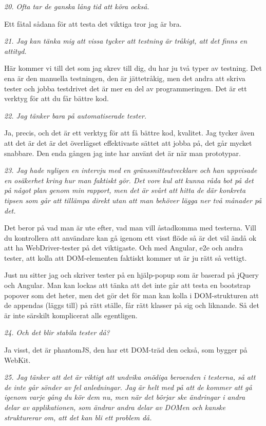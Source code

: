 \documentclass[11pt]{article}
\begin{document}
\emph{20. Ofta tar de ganska lång tid att köra också.}

Ett fåtal sådana för att testa det viktiga tror jag är bra.

\emph{21. Jag kan tänka mig att vissa tycker att testning är tråkigt, att det finns en attityd.}

Här kommer vi till det som jag skrev till dig, du har ju två typer av testning. Det ena är den manuella testningen, den är jättetråkig, men det andra att skriva tester och jobba testdrivet det är mer en del av programmeringen. Det är ett verktyg för att du får bättre kod.

\emph{22. Jag tänker bara på automatiserade tester.}

Ja, precis, och det är ett verktyg för att få bättre kod, kvalitet. Jag tycker även att det är det  är det överlägset effektivaste sättet att jobba på, det går mycket snabbare. Den enda gången jag inte har använt det är när man prototypar.

\emph{23. Jag hade nyligen en intervju med en gränssnittsutvecklare och han uppvisade en osäkerhet kring hur man faktiskt gör. Det vore kul att kunna råda bot på det på något plan genom min rapport, men det är svårt att hitta de där konkreta tipsen som går att tillämpa direkt utan att man behöver lägga ner två månader på det.}

Det beror på vad man är ute efter, vad man vill åstadkomma med testerna. Vill du kontrollera att användare kan gå igenom ett visst flöde så är det väl ändå ok att ha WebDriver-tester på det viktigaste. Och med Angular, e2e och andra tester, att kolla att DOM-elementen faktiskt kommer ut är ju rätt så vettigt.

Just nu sitter jag och skriver tester på en hjälp-popup som är baserad på jQuery och Angular. Man kan lockas att tänka att det inte går att testa en bootstrap popover som det heter, men det gör det för man kan kolla i DOM-strukturen att de appendas (läggs till) på rätt ställe, får rätt klasser på sig och liknande. Så det är inte särskilt komplicerat alls egentligen.

\emph{24. Och det blir stabila tester då?}

Ja visst, det är phantomJS, den har ett DOM-träd den också, som bygger på WebKit.

\emph{25. Jag tänker att det är viktigt att undvika onödiga beroenden i testerna, så att de inte går sönder av fel anledningar. Jag är helt med på att de kommer att gå igenom varje gång du kör dem nu, men när det börjar ske ändringar i andra delar av applikationen, som ändrar andra delar av DOMen och kanske strukturerar om, att det kan bli ett problem då.}
\end{document}
